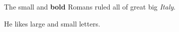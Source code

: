 \documentclass[12pt]{ctexrep}
\begin{document}
\setlength{\parindent}{0em}

{\small The small and
\textbf{bold} Romans ruled}
{\Large all of great big 
{\itshape Italy}.}


He likes {\LARGE large and 
{\small small} letters}.










\end{document}
